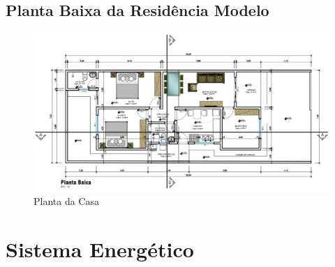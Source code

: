 	   \subsection{Planta Baixa da Residência Modelo}
        \graphicspath{ {figuras/} }
        \begin{figure}[h]
            \centering
            \includegraphics[scale=0.5]{planta}
            \caption{Planta da Casa}
            \label{fig:planta}
        \end{figure}

	   \section{Sistema Energético}
